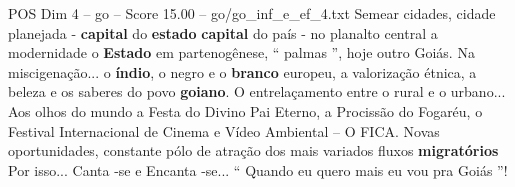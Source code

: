 \begin{textsample}{POS Dim 4 – go – Score 15.00 – go/go\_inf\_e\_ef\_4.txt}
Semear cidades, cidade planejada - \textbf{capital} do \textbf{estado} \textbf{capital} do país - no planalto central a modernidade o \textbf{Estado} em partenogênese, “ palmas ”, hoje outro Goiás.
Na miscigenação... o \textbf{índio}, o negro e o \textbf{branco} europeu, a valorização étnica, a beleza e os saberes do povo \textbf{goiano}.
O entrelaçamento entre o rural e o urbano...
Aos olhos do mundo a Festa do Divino Pai Eterno, a Procissão do Fogaréu, o Festival Internacional de Cinema e Vídeo Ambiental – O FICA.
Novas oportunidades, constante pólo de atração dos mais variados fluxos \textbf{migratórios} Por isso...
Canta -se e Encanta -se... “ Quando eu quero mais eu vou pra Goiás ”!

\end{textsample}
